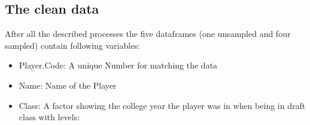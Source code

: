 \documentclass[]{article}
\providecommand{\tightlist}{%
  \setlength{\itemsep}{0pt}\setlength{\parskip}{0pt}}
\begin{document}
\hypertarget{the-clean-data}{%
\subsection{The clean data}\label{the-clean-data}}

After all the described processes the five dataframes (one unsampled and
four sampled) contain following variables:

\begin{itemize}
\tightlist
\item
  Player.Code: A unique Number for matching the data
\item
  Name: Name of the Player
\item
  Class: A factor showing the college year the player was in when being
  in draft class with levels:


\end{itemize}
\end{document}
